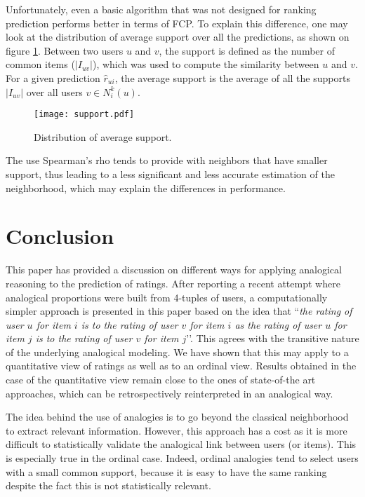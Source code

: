 \documentclass[conference]{IEEEtran}
\newcommand{\predr}[1]{\hat{r}_{#1}}
\begin{document}
Unfortunately, even a basic algorithm that was not designed for ranking
prediction performs better in terms of FCP. To explain this difference, one may
look at the distribution of average support over all the predictions, as shown
on figure \ref{FIG_SUPPORT}. Between
two users $u$ and $v$, the support is defined as the number of common items
($|I_{uv}|$), which was used to compute the similarity between $u$ and $v$. For
a given prediction $\predr{ui}$, the average support is the average of all the
supports $|I_{uv}|$ over all users $v \in N_i^k(u)$.

\begin{figure}[!h]
\centering
\texttt{[image: support.pdf]}
\caption{Distribution of average support.}
\label{FIG_SUPPORT}
\end{figure}

The use Spearman's rho tends to provide with neighbors that have smaller
support, thus leading to a less significant and less accurate estimation of the
neighborhood, which may explain the differences in performance.

\section{Conclusion}

This paper has provided a discussion on different ways for applying analogical
reasoning to the prediction of ratings.  After reporting a recent attempt where
analogical proportions were built from 4-tuples of users, a
computationally simpler approach is presented in this paper based on the idea
that ``\textit{the rating of user $u$ for item $i$ is to the rating of user $v$
  for item $i$ as the rating of user $u$ for item $j$ is to the rating of user
  $v$ for item $j$}’’.  This agrees with the transitive nature of the
  underlying analogical modeling.  We have shown that this may apply to a
  quantitative view of ratings as well as to an ordinal view.  Results obtained
  in the case of the quantitative view remain close to the ones of state-of-the
  art approaches, which can be retrospectively reinterpreted in an analogical
  way.
  
The idea behind the use of analogies is to go beyond the classical neighborhood
to extract relevant information. However, this approach has a cost as it is more difficult
to statistically validate the analogical link between users (or items).
This is especially true in the ordinal case.
Indeed, ordinal analogies tend to select users with a small common support, 
because it is easy to have the same ranking despite the fact this is not statistically relevant. 
\end{document}
